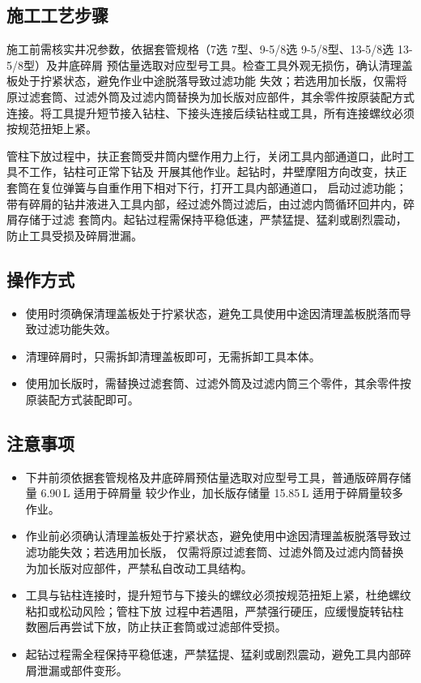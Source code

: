 \subsection{施工工艺步骤}

施工前需核实井况参数，依据套管规格（7\inch 选 7\inch 型、9-5/8\inch 选 9-5/8\inch 型、13-5/8\inch 选
13-5/8\inch 型）及井底碎屑
预估量选取对应型号工具。检查工具外观无损伤，确认清理盖板处于拧紧状态，避免作业中途脱落导致过滤功能
失效；若选用加长版，仅需将原过滤套筒、过滤外筒及过滤内筒替换为加长版对应部件，其余零件按原装配方式
连接。将工具提升短节接入钻柱、下接头连接后续钻柱或工具，所有连接螺纹必须按规范扭矩上紧。

管柱下放过程中，扶正套筒受井筒内壁作用力上行，关闭工具内部通道口，此时工具不工作，钻柱可正常下钻及
开展其他作业。起钻时，井壁摩阻方向改变，扶正套筒在复位弹簧与自重作用下相对下行，打开工具内部通道口，
启动过滤功能；带有碎屑的钻井液进入工具内部，经过滤外筒过滤后，由过滤内筒循环回井内，碎屑存储于过滤
套筒内。起钻过程需保持平稳低速，严禁猛提、猛刹或剧烈震动，防止工具受损及碎屑泄漏。

\subsection{操作方式}
\begin{itemize}
	\item 使用时须确保清理盖板处于拧紧状态，避免工具使用中途因清理盖板脱落而导致过滤功能失效。
	\item 清理碎屑时，只需拆卸清理盖板即可，无需拆卸工具本体。
	\item 使用加长版时，需替换过滤套筒、过滤外筒及过滤内筒三个零件，其余零件按原装配方式装配即可。
\end{itemize}

\subsection{注意事项}

\begin{itemize}
	\item 下井前须依据套管规格及井底碎屑预估量选取对应型号工具，普通版碎屑存储量 6.90\,L 适用于碎屑量
	较少作业，加长版存储量 15.85\,L 适用于碎屑量较多作业。
	\item 作业前必须确认清理盖板处于拧紧状态，避免使用中途因清理盖板脱落导致过滤功能失效；若选用加长版，
	仅需将原过滤套筒、过滤外筒及过滤内筒替换为加长版对应部件，严禁私自改动工具结构。
	\item 工具与钻柱连接时，提升短节与下接头的螺纹必须按规范扭矩上紧，杜绝螺纹粘扣或松动风险；管柱下放
	过程中若遇阻，严禁强行硬压，应缓慢旋转钻柱数圈后再尝试下放，防止扶正套筒或过滤部件受损。
	\item 起钻过程需全程保持平稳低速，严禁猛提、猛刹或剧烈震动，避免工具内部碎屑泄漏或部件变形。
\end{itemize}

